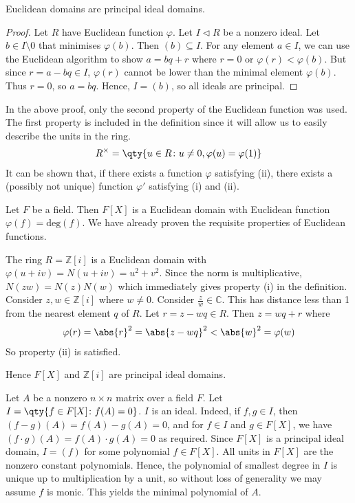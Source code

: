 \begin{proposition}
	Euclidean domains are principal ideal domains.
\end{proposition}
\begin{proof}
	Let $R$ have Euclidean function $\varphi$.
	Let $I \triangleleft R$ be a nonzero ideal.
	Let $b \in I \setminus \qty{0}$ that minimises $\varphi(b)$.
	Then $(b) \subseteq I$.
	For any element $a \in I$, we can use the Euclidean algorithm to show $a = bq + r$ where $r = 0$ or $\varphi(r) < \varphi(b)$.
	But since $r = a - bq \in I$, $\varphi(r)$ cannot be lower than the minimal element $\varphi(b)$.
	Thus $r = 0$, so $a = bq$.
	Hence, $I = (b)$, so all ideals are principal.
\end{proof}
\begin{remark}
	In the above proof, only the second property of the Euclidean function was used.
	The first property is included in the definition since it will allow us to easily describe the units in the ring.
	\begin{align*}
		R^\times = \qty{u \in R \colon u \neq 0, \varphi(u) = \varphi(1)}
	\end{align*}
	It can be shown that, if there exists a function $\varphi$ satisfying (ii), there exists a (possibly not unique) function $\varphi'$ satisfying (i) and (ii).
\end{remark}
\begin{example}
	Let $F$ be a field.
	Then $F[X]$ is a Euclidean domain with Euclidean function $\varphi(f) = \mathrm{deg}(f)$.
	We have already proven the requisite properties of Euclidean functions.

	The ring $R = \mathbb Z[i]$ is a Euclidean domain with $\varphi(u+iv) = N(u+iv) = u^2+v^2$.
	Since the norm is multiplicative, $N(zw) = N(z)N(w)$ which immediately gives property (i) in the definition.
	Consider $z, w \in \mathbb Z[i]$ where $w \neq 0$.
	Consider $\frac{z}{w} \in \mathbb C$.
	This has distance less than 1 from the nearest element $q$ of $R$.
	Let $r = z - w q \in R$.
	Then $z = w q + r$ where
	\begin{align*}
		\varphi(r) = \abs{r}^2 = \abs{z - w q}^2 < \abs{w}^2 = \varphi(w)
	\end{align*}
	So property (ii) is satisfied.

	Hence $F[X]$ and $\mathbb Z[i]$ are principal ideal domains.
\end{example}
\begin{example}
	Let $A$ be a nonzero $n \times n$ matrix over a field $F$.
	Let $I = \qty{f \in F[X] \colon f(A) = 0}$.
	$I$ is an ideal.
	Indeed, if $f, g \in I$, then $(f-g)(A) = f(A) - g(A) = 0$, and for $f \in I$ and $g \in F[X]$, we have $(f \cdot g)(A) = f(A) \cdot g(A) = 0$ as required.
	Since $F[X]$ is a principal ideal domain, $I = (f)$ for some polynomial $f \in F[X]$.
	All units in $F[X]$ are the nonzero constant polynomials.
	Hence, the polynomial of smallest degree in $I$ is unique up to multiplication by a unit, so without loss of generality we may assume $f$ is monic.
	This yields the minimal polynomial of $A$.
\end{example}
